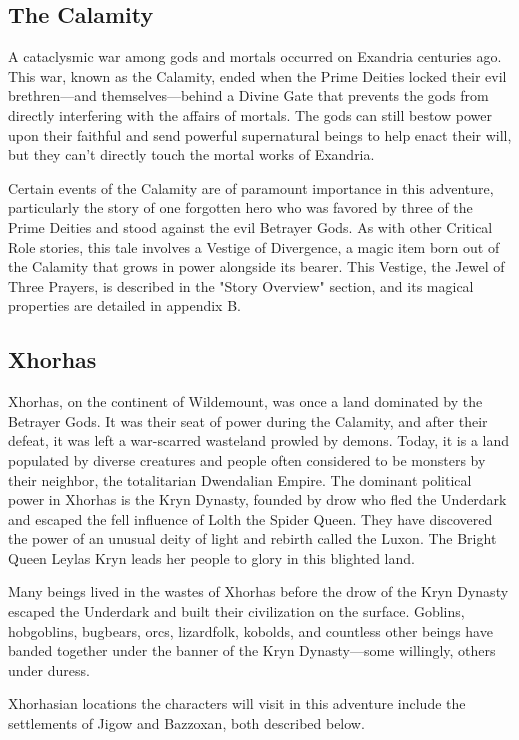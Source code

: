 \documentclass[10pt,a4paper,twoside,bg=print,twocolumn,openany,nodeprecatedcode]{dndbook}
\begin{document}
\subsection{The Calamity}
A cataclysmic war among gods and mortals occurred on Exandria centuries ago. This war, known as the Calamity, ended when the Prime Deities locked their evil brethren—and themselves—behind a Divine Gate that prevents the gods from directly interfering with the affairs of mortals. The gods can still bestow power upon their faithful and send powerful supernatural beings to help enact their will, but they can't directly touch the mortal works of Exandria.

Certain events of the Calamity are of paramount importance in this adventure, particularly the story of one forgotten hero who was favored by three of the Prime Deities and stood against the evil Betrayer Gods. As with other Critical Role stories, this tale involves a Vestige of Divergence, a magic item born out of the Calamity that grows in power alongside its bearer. This Vestige, the Jewel of Three Prayers, is described in the "Story Overview" section, and its magical properties are detailed in appendix B.

\subsection{Xhorhas}
Xhorhas, on the continent of Wildemount, was once a land dominated by the Betrayer Gods. It was their seat of power during the Calamity, and after their defeat, it was left a war-scarred wasteland prowled by demons. Today, it is a land populated by diverse creatures and people often considered to be monsters by their neighbor, the totalitarian Dwendalian Empire. The dominant political power in Xhorhas is the Kryn Dynasty, founded by drow who fled the Underdark and escaped the fell influence of Lolth the Spider Queen. They have discovered the power of an unusual deity of light and rebirth called the Luxon. The Bright Queen Leylas Kryn leads her people to glory in this blighted land.

Many beings lived in the wastes of Xhorhas before the drow of the Kryn Dynasty escaped the Underdark and built their civilization on the surface. Goblins, hobgoblins, bugbears, orcs, lizardfolk, kobolds, and countless other beings have banded together under the banner of the Kryn Dynasty—some willingly, others under duress.

Xhorhasian locations the characters will visit in this adventure include the settlements of Jigow and Bazzoxan, both described below.
\end{document}
